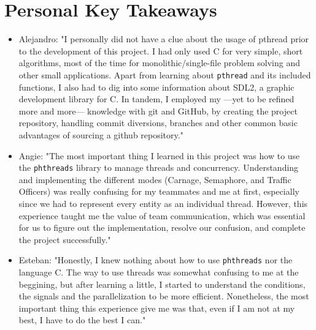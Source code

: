 \documentclass[12pt]{article}
\begin{document}
\section{Personal Key Takeaways}
\begin{itemize}
    \item Alejandro: "I personally did not have a clue about the usage of pthread prior to the development of this project. I had only used C for very simple, short algorithms, most of the time for monolithic/single-file problem solving and other small applications. Apart from learning about \texttt{pthread} and its included functions, I also had to dig into some information about SDL2, a graphic development library for C. In tandem, I employed my —yet to be refined more and more— knowledge with git and GitHub, by creating the project repository, handling commit diversions, branches and other common basic advantages of sourcing a github repository."
    \item Angie: "The most important thing I learned in this project was how to use the \texttt{phthreads} library to manage threads and concurrency. Understanding and implementing the different modes (Carnage, Semaphore, and Traffic Officers) was really confusing for my teammates and me at first, especially since we had to represent every entity as an individual thread. However, this experience taught me the value of team communication, which was essential for us to figure out the implementation, resolve our confusion, and complete the project successfully."
    \item Esteban: "Honestly, I knew nothing about how to use \texttt{phthreads} nor the language C. The way to use threads was somewhat confusing to me at the beggining, but after learning a little, I started to understand the conditions, the signals and the parallelization to be more efficient. Nonetheless, the most important thing this experience give me was that, even if I am not at my best, I have to do the best I can."
\end{itemize}



\end{document}
